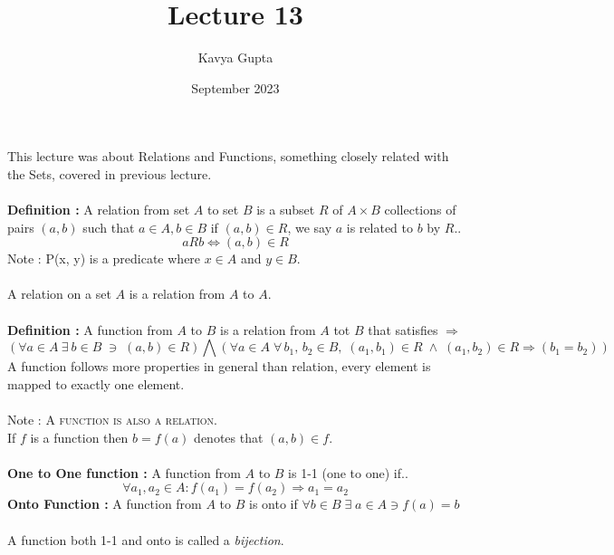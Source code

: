 \documentclass{article}
\title{Lecture 13}
\author{Kavya Gupta}
\date{September 2023}
\begin{document}
\maketitle
This lecture was about Relations and Functions, something closely related with the Sets, covered in previous lecture.\\ \\
\textbf{Definition :} A relation from set $A$ to set $B$ is a subset $R$ of $A \times B$ collections of pairs $(a, b)$ such that $a \in A, b \in B$ if $(a, b) \in R$, we say $a$ is related to $b$ by $R$..
\[aRb \iff (a, b) \in R\]
Note : P(x, y) is a  predicate where $x \in A$ and $y \in B$.\\ \\
A relation on a set $A$ is a relation from $A$ to $A$.\\ \\
\textbf{Definition :} A function from $A$ to $B$ is a relation from $A$ tot $B$ that satisfies $\Rightarrow$
\[(\forall a \in A \: \exists \: b \in B \;  \ni \; (a, b) \in R) \bigwedge (\forall a \in A \; \forall \, b_{1}, \, b_{2} \in B, \; (a_{1}, b_{1}) \in R \; \wedge \; (a_{1}, b_{2}) \in R \Longrightarrow (b_{1} = b_{2})) \]
A function follows more properties in general than relation, every element is mapped to exactly one element.\\ \\
Note : \textsc{A function is also a relation.}\\
If $f$ is a function then $b=f(a)$ denotes that $(a, b) \in f$.\\ \\
\textbf{One to One function :} A function from $A$ to $B$ is 1-1 (one to one) if..
\[\forall a_{1}, a_{2} \in A : f(a_{1}) = f(a_{2}) \Longrightarrow a_{1} = a_{2}\]
\textbf{Onto Function :} A function from $A$ to $B$ is onto if $\forall b \in B \; \exists \; a \in A \ni f(a)=b$\\ \\
A function both 1-1 and onto is called a \textit{bijection}.
\end{document}
